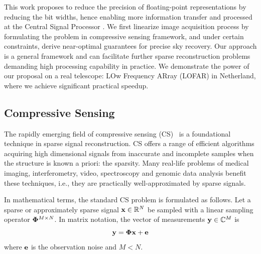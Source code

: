 \documentclass{article}
\begin{document}
This work proposes to reduce the precision of floating-point representations by reducing the bit widths, hence enabling more information transfer and processed at the Central Signal Processor \cite{rik2016ska}. We first linearize image acquisition process by formulating the problem in compressive sensing framework, and under certain constraints, derive near-optimal guarantees for precise sky recovery. Our approach is a general framework and can facilitate further sparse reconstruction problems demanding high processing capability in practice. We demonstrate the power of our proposal on a real telescope: LOw Frequency ARray (LOFAR) in Netherland, where we achieve significant practical speedup.


\subsection{Compressive Sensing}
The rapidly emerging field of compressive sensing (CS)~\cite{donoho2006cs, candes2006cs, candes2006cs2} is a foundational technique in sparse signal reconstruction. CS offers a range of efficient algorithms acquiring high dimensional signals from inaccurate and incomplete samples when the structure is known a priori: the sparsity. Many real-life problems of medical imaging, interferometry, video, spectroscopy and genomic data analysis  benefit these techniques, i.e., they are practically well-approximated by sparse signals.

In mathematical terms, the standard CS problem is formulated as follows. Let a sparse or approximately sparse signal ${\bf x}\in \mathbb{R}^N$ be sampled with a linear sampling operator ${\bf \Phi}^{M\times N}$. In matrix notation, the vector of measurements ${\bf y} \in \mathbb{C}^M$ is
\begin{equation}\label{CS_model}
 {\bf y} =  {\bf \Phi}  {\bf x} + {\bf e}
\end{equation}
where ${\bf e}$ is the observation noise and $M < N$.
\end{document}
